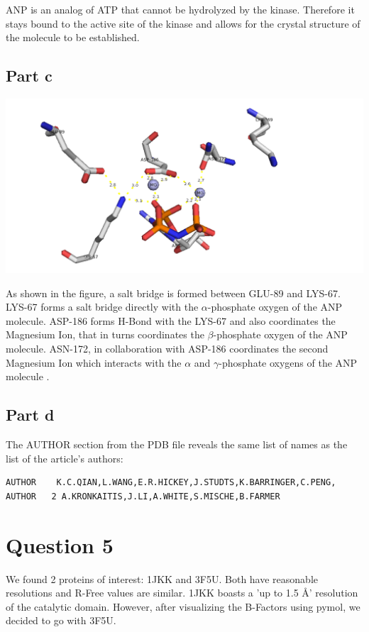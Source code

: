 \documentclass[11pt, a4paper,titlepage]{article}
\begin{document}
ANP is an analog of ATP that cannot be hydrolyzed by the
kinase. Therefore it stays bound to the active site of the kinase and
allows for the crystal structure of the molecule to be established.

\subsection*{Part c}

\includegraphics[width=15cm]{./Figures/4c.png}

As shown in the figure, a salt bridge is formed between GLU-89 and
LYS-67. LYS-67 forms a salt bridge directly with the $\alpha$-phosphate
oxygen of the ANP molecule. ASP-186 forms H-Bond with the LYS-67 and
also coordinates the Magnesium Ion, that in turns coordinates the
$\beta$-phosphate oxygen of the ANP molecule. ASN-172, in collaboration
with ASP-186 coordinates the second Magnesium Ion which interacts with
the $\alpha$ and $\gamma$-phosphate oxygens of the ANP molecule
\cite{CSPim1Kinase}.

\subsection*{Part d}

The AUTHOR section from the PDB file reveals the same list of names as
the list of the article's authors:

\begin{verbatim}
AUTHOR    K.C.QIAN,L.WANG,E.R.HICKEY,J.STUDTS,K.BARRINGER,C.PENG,               
AUTHOR   2 A.KRONKAITIS,J.LI,A.WHITE,S.MISCHE,B.FARMER         
\end{verbatim}
 
\section*{Question 5}
We found 2 proteins of interest: 1JKK and 3F5U. Both have reasonable
resolutions and R-Free values are similar. 1JKK boasts a 'up to 1.5 \AA'
resolution of the catalytic domain. However, after visualizing the
B-Factors using pymol, we decided to go with 3F5U.
\end{document}
